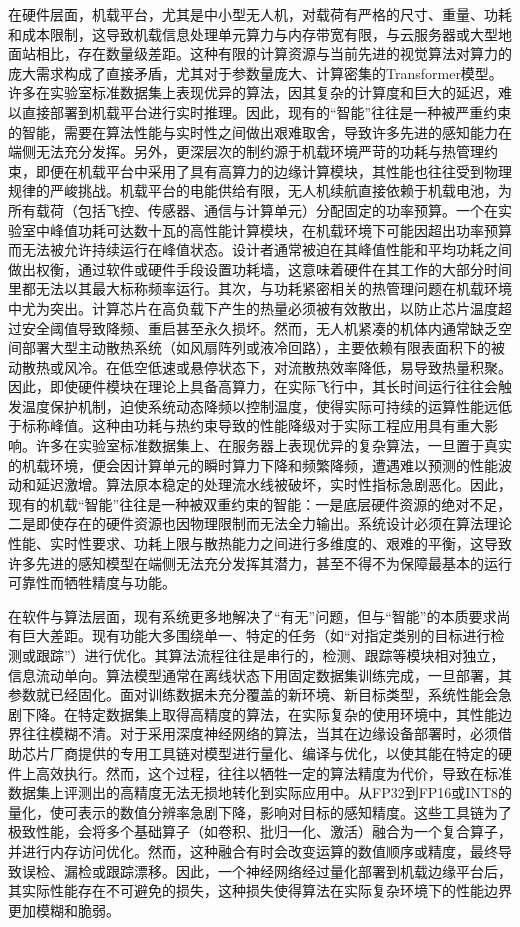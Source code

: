 在硬件层面，机载平台，尤其是中小型无人机，对载荷有严格的尺寸、重量、功耗和成本限制，这导致机载信息处理单元算力与内存带宽有限，与云服务器或大型地面站相比，存在数量级差距。这种有限的计算资源与当前先进的视觉算法对算力的庞大需求构成了直接矛盾，尤其对于参数量庞大、计算密集的Transformer模型。许多在实验室标准数据集上表现优异的算法，因其复杂的计算度和巨大的延迟，难以直接部署到机载平台进行实时推理。因此，现有的“智能”往往是一种被严重约束的智能，需要在算法性能与实时性之间做出艰难取舍，导致许多先进的感知能力在端侧无法充分发挥。另外，更深层次的制约源于机载环境严苛的功耗与热管理约束，即便在机载平台中采用了具有高算力的边缘计算模块，其性能也往往受到物理规律的严峻挑战。机载平台的电能供给有限，无人机续航直接依赖于机载电池，为所有载荷（包括飞控、传感器、通信与计算单元）分配固定的功率预算。一个在实验室中峰值功耗可达数十瓦的高性能计算模块，在机载环境下可能因超出功率预算而无法被允许持续运行在峰值状态。设计者通常被迫在其峰值性能和平均功耗之间做出权衡，通过软件或硬件手段设置功耗墙，这意味着硬件在其工作的大部分时间里都无法以其最大标称频率运行。其次，与功耗紧密相关的热管理问题在机载环境中尤为突出。计算芯片在高负载下产生的热量必须被有效散出，以防止芯片温度超过安全阈值导致降频、重启甚至永久损坏。然而，无人机紧凑的机体内通常缺乏空间部署大型主动散热系统（如风扇阵列或液冷回路），主要依赖有限表面积下的被动散热或风冷。在低空低速或悬停状态下，对流散热效率降低，易导致热量积聚。因此，即使硬件模块在理论上具备高算力，在实际飞行中，其长时间运行往往会触发温度保护机制，迫使系统动态降频以控制温度，使得实际可持续的运算性能远低于标称峰值。这种由功耗与热约束导致的性能降级对于实际工程应用具有重大影响。许多在实验室标准数据集上、在服务器上表现优异的复杂算法，一旦置于真实的机载环境，便会因计算单元的瞬时算力下降和频繁降频，遭遇难以预测的性能波动和延迟激增。算法原本稳定的处理流水线被破坏，实时性指标急剧恶化。因此，现有的机载“智能”往往是一种被双重约束的智能：一是底层硬件资源的绝对不足，二是即使存在的硬件资源也因物理限制而无法全力输出。系统设计必须在算法理论性能、实时性要求、功耗上限与散热能力之间进行多维度的、艰难的平衡，这导致许多先进的感知模型在端侧无法充分发挥其潜力，甚至不得不为保障最基本的运行可靠性而牺牲精度与功能。

在软件与算法层面，现有系统更多地解决了“有无”问题，但与“智能”的本质要求尚有巨大差距。现有功能大多围绕单一、特定的任务（如“对指定类别的目标进行检测或跟踪”）进行优化。其算法流程往往是串行的，检测、跟踪等模块相对独立，信息流动单向。算法模型通常在离线状态下用固定数据集训练完成，一旦部署，其参数就已经固化。面对训练数据未充分覆盖的新环境、新目标类型，系统性能会急剧下降。在特定数据集上取得高精度的算法，在实际复杂的使用环境中，其性能边界往往模糊不清。对于采用深度神经网络的算法，当其在边缘设备部署时，必须借助芯片厂商提供的专用工具链对模型进行量化、编译与优化，以使其能在特定的硬件上高效执行。然而，这个过程，往往以牺牲一定的算法精度为代价，导致在标准数据集上评测出的高精度无法无损地转化到实际应用中。从FP32到FP16或INT8的量化，使可表示的数值分辨率急剧下降，影响对目标的感知精度。这些工具链为了极致性能，会将多个基础算子（如卷积、批归一化、激活）融合为一个复合算子，并进行内存访问优化。然而，这种融合有时会改变运算的数值顺序或精度，最终导致误检、漏检或跟踪漂移。因此，一个神经网络经过量化部署到机载边缘平台后，其实际性能存在不可避免的损失，这种损失使得算法在实际复杂环境下的性能边界更加模糊和脆弱。

